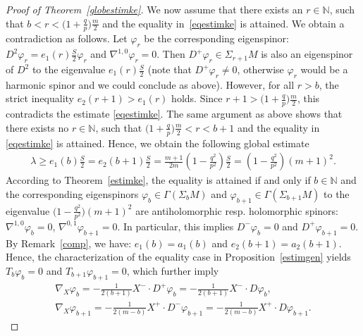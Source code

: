 \documentclass[10pt,a4paper]{amsart}
\numberwithin{equation}{section}
\theoremstyle{definition}
\begin{document}
\begin{proof}[Proof of Theorem~\ref{globestimke}]
We now assume that there exists an $r\in\mathbb{N}$, such that $b<r< \big(1+\frac{q}{p}\big)\frac{m}{2}$ and the equality in~\eqref{eqestimke} is attained. We obtain a contradiction as follows. Let $\varphi_r$ be the corresponding eigenspinor: $D^2\varphi_r=e_1(r)\frac{S}{2}\varphi_r$ and $\nabla^{1,0}\varphi_r=0$. Then $D^+\varphi_r\in\Sigma_{r+1}M$ is also an eigenspinor of $D^2$ to the eigenvalue $e_1(r)\frac{S}{2}$ (note that $D^+\varphi_r\neq 0$, otherwise $\varphi_r$ would be a harmonic spinor and we could conclude as above). However, for all $r>b$, the strict inequality $e_2(r+1)>e_1(r)$ holds. Since $r+1>\big(1+\frac{q}{p}\big)\frac{m}{2}$, this contradicts the estimate \eqref{eqestimke}. The same argument as above shows that there exists no $r\in\mathbb{N}$, such that $\big(1+\frac{q}{p}\big)\frac{m}{2}<r<b+1 $ and the equality in \eqref{eqestimke} is attained. Hence, we obtain the following global estimate
\begin{gather*}
\lambda\geq e_1(b)\frac{S}{2}=e_2(b+1)\frac{S}{2}=\frac{m+1}{2m}\left(1-\frac{q^2}{p^2}\right)\frac{S}{2}=\left(1-\frac{q^2}{p^2}\right)(m+1)^2.
\end{gather*}
According to Theorem~\ref{estimke}, the equality is attained if and only if $b \in \mathbb N$ and the corresponding eigenspinors  $\varphi_{b}\in\Gamma(\Sigma_{b} M)$ and $\varphi_{b+1}\in\Gamma(\Sigma_{b+1}M)$ to the eigenvalue $\big(1-\frac{q^2}{p^2}\big)(m+1)^2$ are antiholomorphic resp. holomorphic spinors: $\nabla^{1,0}\varphi_{b}=0$, $\nabla^{0,1}\varphi_{b+1}=0$. In particular, this implies $D^-\varphi_{b}=0$ and $D^+\varphi_{b+1}=0$. By Remark~\ref{comp}, we have: $e_1(b)=a_1(b)$ and $e_2(b+1)=a_2(b+1)$. Hence, the characterization of the equality case in Proposition~\ref{estimgen} yields $T_{b}\varphi_{b}=0$ and $T_{b+1}\varphi_{b+1}=0$, which further imply
\begin{gather}\label{twis1}
\nabla_X \varphi_{b}=-\frac{1}{2(b+1)}X^-\cdot D^+\varphi_{b}=-\frac{1}{2(b+1)}X^-\cdot D\varphi_{b},
\\
\nabla_X \varphi_{b+1}=-\frac{1}{2(m-b)}X^+\cdot D^-\varphi_{b+1}=-\frac{1}{2(m-b)}X^+\cdot D\varphi_{b+1}.\nonumber
\end{gather}


\end{proof}
\end{document}
